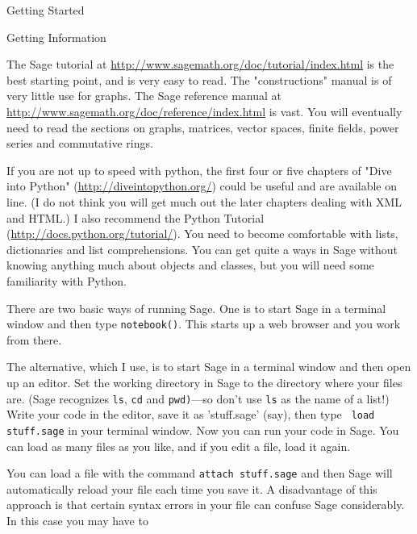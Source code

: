 \begin{chap}{Getting Started}
    
\begin{sect}{Getting Information}
%
\begin{para}
The Sage tutorial at \url{http://www.sagemath.org/doc/tutorial/index.html}
is the best starting point, and is very easy to read.  The "constructions" manual 
is of very little use for graphs. The Sage reference manual at
\url{http://www.sagemath.org/doc/reference/index.html} is vast. You will eventually 
need to read the sections on graphs, matrices, vector spaces, finite fields,
power series and commutative rings.
\end{para}
%
\begin{para}
If you are not up to speed with python, the first four or five chapters of 
"Dive into Python"  (\url{http://diveintopython.org/})
could be useful and are available on line.  (I do not think
you will get much out the later chapters dealing with XML and HTML.)
I also recommend the Python Tutorial (\url{http://docs.python.org/tutorial/}).  
You need to become comfortable with lists, dictionaries and list comprehensions.
You can get quite a ways in Sage without knowing anything much about objects 
and classes, but you will need some familiarity with Python.
\end{para}
%
\begin{para}
There are two basic ways of running Sage.  One is to start Sage in a
terminal window and then type \texttt{notebook()}.  This starts up a 
web browser and you work from there.
\end{para}
%
\begin{para}
The alternative, which I use, is to start Sage in a terminal window and then 
open up an editor. Set the working directory in Sage to the directory where your 
files are. (Sage recognizes \texttt{ls}, \texttt{cd} and \texttt{pwd)}---so don't use
\texttt{ls} as the name of a list!) Write your code in the editor, save it as
'stuff.sage' (say), then type  \texttt{ load stuff.sage} in your terminal window. 
Now you can run your code in Sage. You can load as many files as you like, and if 
you edit a file, load it again.
\end{para}
%
\begin{para}
You can load a file with the command \texttt{attach stuff.sage} and then
Sage will automatically reload your file each time
you save it.  A disadvantage of this approach is that certain syntax errors 
in your file can confuse Sage considerably.  In this case you may have to 

\end{para}
\end{sect}
\end{chap}

